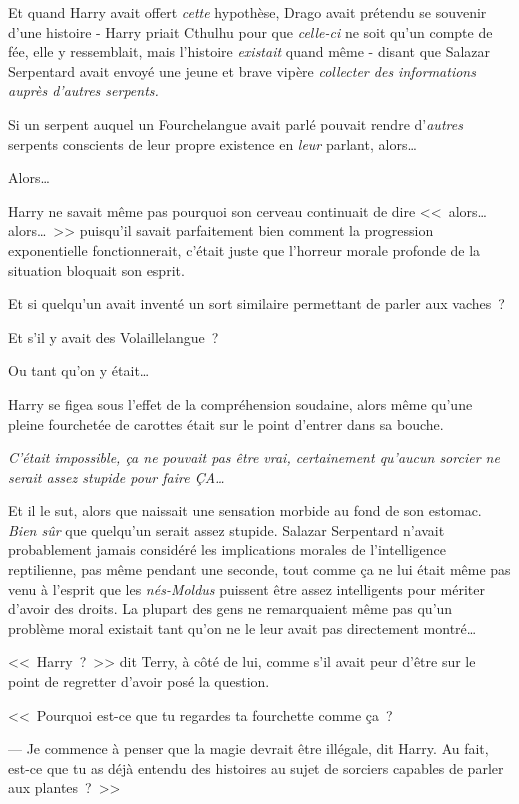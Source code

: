 Et quand Harry avait offert \emph{cette} hypothèse, Drago avait prétendu se souvenir d'une histoire - Harry priait Cthulhu pour que \emph{celle-ci} ne soit qu'un compte de fée, elle y ressemblait, mais l'histoire \emph{existait} quand même - disant que Salazar Serpentard avait envoyé une jeune et brave vipère \emph{collecter des informations auprès d'autres serpents.}

Si un serpent auquel un Fourchelangue avait parlé pouvait rendre d'\emph{autres} serpents conscients de leur propre existence en \emph{leur} parlant, alors…

Alors…

Harry ne savait même pas pourquoi son cerveau continuait de dire <<~alors… alors…~>> puisqu'il savait parfaitement bien comment la progression exponentielle fonctionnerait, c'était juste que l'horreur morale profonde de la situation bloquait son esprit.

Et si quelqu'un avait inventé un sort similaire permettant de parler aux vaches~?

Et s'il y avait des Volaillelangue~?

Ou tant qu'on y était…

Harry se figea sous l'effet de la compréhension soudaine, alors même qu'une pleine fourchetée de carottes était sur le point d'entrer dans sa bouche.

\emph{C'était impossible, ça ne pouvait pas être vrai, certainement qu'aucun sorcier ne serait assez stupide pour faire ÇA…}

Et il le sut, alors que naissait une sensation morbide au fond de son estomac. \emph{Bien sûr} que quelqu'un serait assez stupide. Salazar Serpentard n'avait probablement jamais considéré les implications morales de l'intelligence reptilienne, pas même pendant une seconde, tout comme ça ne lui était même pas venu à l'esprit que les \emph{nés-Moldus} puissent être assez intelligents pour mériter d'avoir des droits. La plupart des gens ne remarquaient même pas qu'un problème moral existait tant qu'on ne le leur avait pas directement montré…

<<~Harry~?~>> dit Terry, à côté de lui, comme s'il avait peur d'être sur le point de regretter d'avoir posé la question.

<<~Pourquoi est-ce que tu regardes ta fourchette comme ça~?

--- Je commence à penser que la magie devrait être illégale, dit Harry. Au fait, est-ce que tu as déjà entendu des histoires au sujet de sorciers capables de parler aux plantes~?~>>

